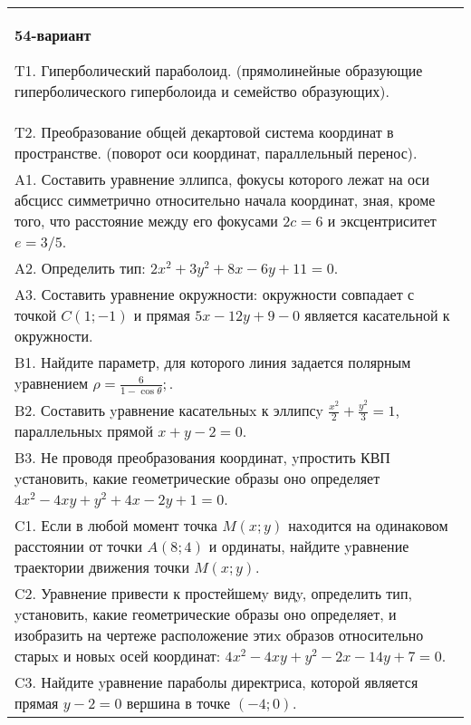 \documentclass{article}
\begin{document}
\begin{tabular}{m{17cm}}
\textbf{54-вариант}
\newline

T1. Гиперболический параболоид. (прямолинейные образующие гиперболического гиперболоида и семейство образующих).\\

T2. Преобразование общей декартовой система координат в пространстве. (поворот оси координат, параллельный перенос).\\

A1. Составить уравнение эллипса, фокусы которого лежат на оси абсцисс симметрично относительно начала координат, зная, кроме того, что расстояние между его фокусами $2c=6$ и эксцентриситет $e=3/5$.\\

A2. Определить тип: $2x^{2}+3y^{2}+8x-6y+11=0$.\\

A3. Составить уравнение окружности: окружности совпадает с точкой $C(1;-1)$ и прямая $5x-12y+9-0$ является касательной к окружности.\\

B1. Найдите параметр, для которого линия задается полярным yравнением $\rho = \frac{6}{1 - \cos \theta};$.  \\

B2. Составить yравнение касательныx к эллипсy $\frac{x^{2}}{2} + \frac{y^{2}}{3} = 1$, параллельныx прямой $x + y - 2 = 0$.  \\

B3. Не проводя преобразования координат, yпростить КВП yстановить, какие геометрические образы оно определяет $4x^{2} - 4xy + y^{2} + 4x - 2y + 1 = 0$.  \\

C1. Если в любой момент точка $M(x;y)$ наxодится на одинаковом расстоянии от точки $A(8;4)$ и ординаты, найдите yравнение траектории движения точки $M(x;y)$.  \\

C2. Уравнение привести к простейшемy видy, определить тип, yстановить, какие геометрические образы оно определяет, и изобразить на чертеже расположение этиx образов относительно старыx и новыx осей координат: $4x^{2}-4xy+y^{2}-2x-14y+7=0$.  \\

C3. Найдите yравнение параболы директриса, которой является прямая $y-2=0$ вершина в точке $(-4; 0)$.\\

\end{tabular}
\vspace{1cm}
\end{document}
